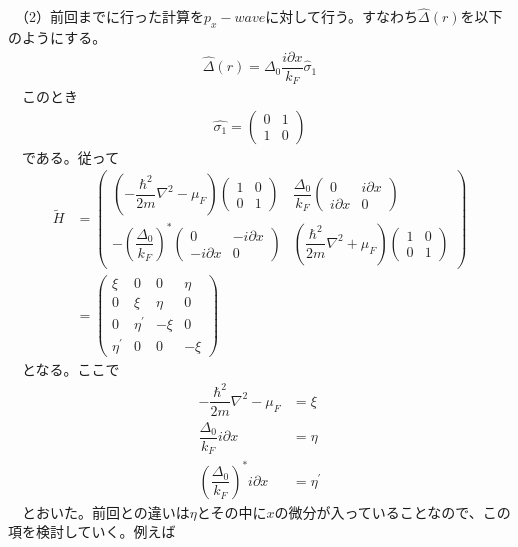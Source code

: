 \documentclass{jarticle}
\begin{document}
　（2）前回までに行った計算を$p_{x}-wave$に対して行う。すなわち$\hat{\Delta}(r)$を以下のようにする。
　\begin{align}
　\hat{\Delta}(r)=\Delta_0\dfrac{i\partial x}{k_F}\hat\sigma_1
　\end{align}
　このとき
　 \begin{align}
　\hat{\sigma_1}=
　\begin{pmatrix}
　0 & 1\\
　1 & 0
　\end{pmatrix}
　\end{align}
　である。従って
　    \begin{align}
　\tilde{H}&=
　\begin{pmatrix}
　(-\dfrac{\hbar^2}{2m}\nabla^2-\mu_F)\begin{pmatrix}
　1 & 0 \\
　0 & 1
　\end{pmatrix} & \dfrac{\Delta_0}{k_{F}} \begin{pmatrix}
　0 & i\partial x \\
　i\partial x & 0
　\end{pmatrix} \\
　-\left(\dfrac{\Delta_0}{k_{F}}\right)^{*}
　\begin{pmatrix}
　0 & -i\partial x \\
　-i\partial x& 0
　\end{pmatrix} & (\dfrac{\hbar^2}{2m}\nabla^2+\mu_F)\begin{pmatrix}
　1 & 0 \\
　0 & 1
　\end{pmatrix}
　\end{pmatrix}
　\\&=\begin{pmatrix}
　\xi & 0 & 0 & \eta \\ 
　0 & \xi & \eta & 0 \\ 
　0 & \eta^{'} & -\xi & 0 \\ 
　\eta^{'} & 0 & 0 & -\xi
　\end{pmatrix} 
　\end{align}
　となる。ここで
　\begin{align}
　-\dfrac{\hbar^2}{2m}\nabla^2-\mu_F&=\xi\\
　\dfrac{\Delta_0}{k_{F}}i\partial x&=\eta\\
　\left(\dfrac{\Delta_0}{k_{F}}\right)^{*}i\partial x&=\eta^{'}
　\end{align}
　とおいた。前回との違いは$\eta$とその中に$x$の微分が入っていることなので、この項を検討していく。例えば
\end{document}
